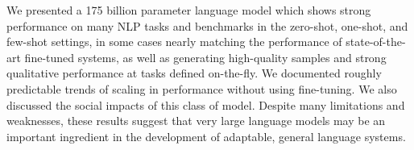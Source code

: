 We presented a 175 billion parameter language model which shows strong performance on many NLP tasks and benchmarks in the zero-shot, one-shot, and few-shot settings, in some cases nearly matching the performance of state-of-the-art fine-tuned systems, as well as generating high-quality samples and strong qualitative performance at tasks defined on-the-fly.  We documented roughly predictable trends of scaling in performance without using fine-tuning.  We also discussed the social impacts of this class of model.  Despite many limitations and weaknesses, these results suggest that very large language models may be an important ingredient in the development of adaptable, general language systems.